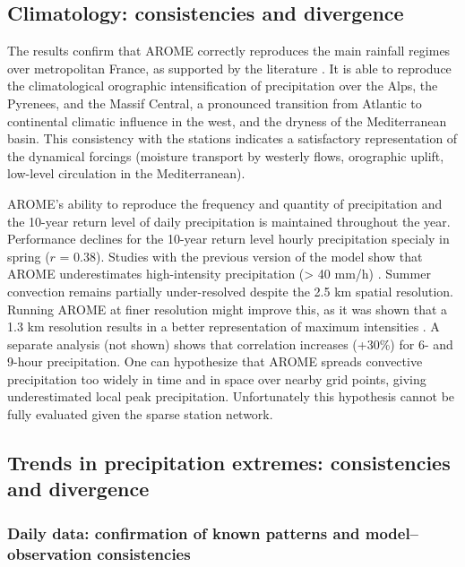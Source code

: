 \documentclass[hess, manuscript]{copernicus}
\begin{document}
\subsection{Climatology: consistencies and divergence}\label{climatology-consistencies-divergence-and-limitations}

The results confirm that AROME correctly reproduces the main rainfall
regimes over metropolitan France, as supported by the literature \citep{Fumiere2020,Caillaud2021,hess-28-2579-2024,LucasPicher2024,Cortes-Hernandez2024}. It is able to reproduce the climatological orographic intensification of precipitation over the Alps,
the Pyrenees, and the Massif Central, a pronounced transition from Atlantic to continental climatic influence in the west, and the dryness of the Mediterranean
basin. This consistency with the stations indicates a satisfactory
representation of the dynamical forcings (moisture transport by westerly
flows, orographic uplift, low-level circulation in the Mediterranean).

AROME's ability to reproduce the frequency and quantity of precipitation and the 10-year return level of daily precipitation
is maintained throughout the year. Performance declines for the
10-year return level hourly precipitation specialy in spring ($r$ = 0.38).
Studies with the previous version of the model show that AROME underestimates high-intensity precipitation (\textgreater{} 40
mm/h) \citep{Caillaud2021,poncet2024convection}. Summer
convection remains partially under-resolved despite the 2.5 km spatial
resolution. Running AROME at finer resolution might improve this, as it was shown that a 1.3 km resolution results in a better representation of maximum intensities \citep{brousseau-etal-2016}. A separate analysis (not shown) shows that
correlation increases (+30\%) for 6- and 9-hour precipitation.
One can hypothesize that AROME spreads convective precipitation too widely in time and in space over nearby grid points, giving underestimated local peak precipitation. Unfortunately this hypothesis cannot be fully evaluated given the sparse station network. 

\subsection{Trends in precipitation extremes: consistencies and
divergence}\label{trends-in-precipitation-extremes-consistencies-divergences-and-limitations}

\subsubsection{Daily data: confirmation of known patterns and model--observation consistencies}
\end{document}
